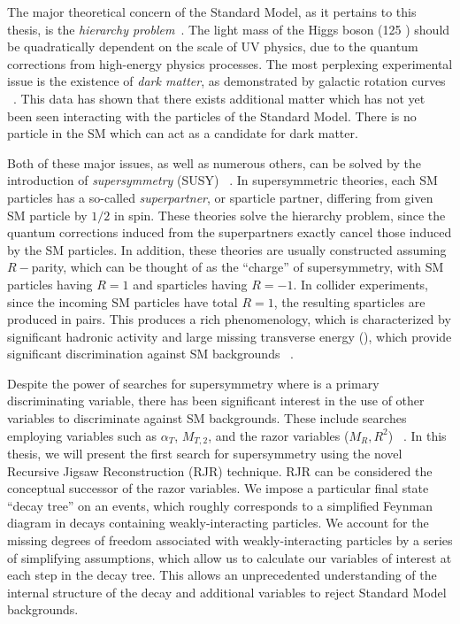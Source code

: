 The major theoretical concern of the Standard Model, as it pertains to this thesis, is the \textit{hierarchy problem}~\cite {Weinberg:1975gm,Weinberg:1979bn, Gildener:1976ai, Susskind:1978ms, susyPrimer}.
The light mass of the Higgs boson (125 \GeV) should be quadratically dependent on the scale of UV physics, due to the quantum corrections from high-energy physics processes.
The most perplexing experimental issue is the existence of \textit{dark matter}, as demonstrated by galactic rotation curves ~\cite{Rubin:1970zza, Roberts:1970zza, Rubin:1980zd, Rubin:1985ze, Bosma:1981zz, Persic:1995ru, darkMatterPrimer}.
This data has shown that there exists additional matter which has not yet been seen interacting with the particles of the Standard Model.
There is no particle in the SM which can act as a candidate for dark matter.

Both of these major issues, as well as numerous others, can be solved by the introduction of \textit{supersymmetry} (SUSY) ~\cite{Miyazawa:1966mfa, Gervais:1971xj, Gervais:1971ji, Golfand:1971iw, Neveu:1971rx, Neveu:1971iv, Volkov:1973ix,  Wess:1973kz, Salam:1974ig, Ferrara:1974ac, Wess:1974tw, susyPrimer,Lykken:1996xt,archilSUSYLectures}.
In supersymmetric theories, each SM particles has a so-called \textit{superpartner}, or sparticle partner, differing from given SM particle by $1/2$ in spin.
These theories solve the hierarchy problem, since the quantum corrections induced from the superpartners exactly cancel those induced by the SM particles.
In addition, these theories are usually constructed assuming $R-$parity, which can be thought of as the ``charge'' of supersymmetry, with SM particles having $R=1$ and sparticles having $R=-1$.
In collider experiments, since the incoming SM particles have total $R=1$, the resulting sparticles are produced in pairs.
This produces a rich phenomenology, which is characterized by significant hadronic activity and large missing transverse energy (\met), which provide significant discrimination against SM backgrounds ~\cite{Farrar:1978xj}.

Despite the power of searches for supersymmetry where \met is a primary discriminating variable, there has been significant interest in the use of other variables to discriminate against SM backgrounds.
These include searches employing variables such as $\alpha_{T}$, $ M_{T,2}$, and the razor variables ($M_R, R^2$) ~\cite{SUSY-2014-05, SUSY-2014-06, SUSY-2014-07, CMS-SUS-12-005, CMS-SUS-11-024, CMS-SUS-12-005, CMS-SUS-10-003, CMS-SUS-11-003, CMS-SUS-12-002,CMS-SUS-13-019, CMS-SUS-15-003, SUSY-2011-22}.
In this thesis, we will present the first search for supersymmetry using the novel Recursive Jigsaw Reconstruction (RJR) technique.
RJR can be considered the conceptual successor of the razor variables.
We impose a particular final state ``decay tree'' on an events, which roughly corresponds to a simplified Feynman diagram in decays containing weakly-interacting particles.
We account for the missing degrees of freedom associated with weakly-interacting particles by a series of simplifying assumptions, which allow us to calculate our variables of interest at each step in the decay tree.
This allows an unprecedented understanding of the internal structure of the decay and additional variables to reject Standard Model backgrounds.

